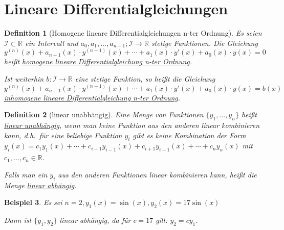 \documentclass[fontset=ubuntu,12pt,a4paper]{scrreprt}
\newtheorem{defi}{Definition}[section]
\newtheorem{beispiel}[defi]{Beispiel}
\begin{document}
    \section{Lineare Differentialgleichungen}
    \begin{defi}[Homogene lineare Differentialgleichungen n-ter Ordnung]
        Es seien \(\mathcal{I} \subset \mathbb{R}\) ein Intervall und \(a_0,a_1,\dots,a_{n-1};\mathcal{I} \to \mathbb{R}\) stetige Funktionen. Die Gleichung
        \[y^{(n)}(x) + a_{n-1}(x) \cdot y^{(n-1)}(x) + \cdots + a_1(x) \cdot y'(x) + a_0(x) \cdot y(x) = 0 \]
        heißt \underline{homogene lineare Differentialgleichung n-ter Ordnung}.

        Ist weiterhin \(b:\mathcal{I}\to\mathbb{R}\) eine stetige Funktion, so heißt die Gleichung
        \[y^{(n)}(x) + a_{n-1}(x) \cdot y^{(n-1)}(x) + \cdots + a_1(x) \cdot y'(x) + a_0(x) \cdot y(x) = b(x) \]
        \underline{inhomogene lineare Differentialgleichung n-ter Ordnung}.
    \end{defi}

    \begin{defi}[linear unabhängig]
        Eine Menge von Funktionen \(\{y_1,\dots,y_n\}\) heißt \underline{linear unabhängig}, wenn man keine Funktion aus den anderen linear kombinieren kann, d.h.\ für eine beliebige Funktion \(y_i\) gibt es keine Kombination der Form \(y_i(x)=c_1y_1(x)+\cdots+c_{i-1}y_{i-1}(x)+c_{i+1}y_{i+1}(x)+\cdots+c_n y_n(x)\) mit \(c_1,\dots,c_n \in \mathbb{R}\).

        Falls man ein \(y_i\) aus den anderen Funktionen linear kombinieren kann, heißt die Menge \underline{linear abhängig}.
    \end{defi}

    \begin{beispiel}
        Es sei \(n=2,y_1(x)=\sin(x),y_2(x)=17\sin(x)\)

        Dann ist \(\{y_1,y_2\}\) linear abhängig, da für \(c=17\) gilt: \(y_2=cy_1\).
    \end{beispiel}
\end{document}
